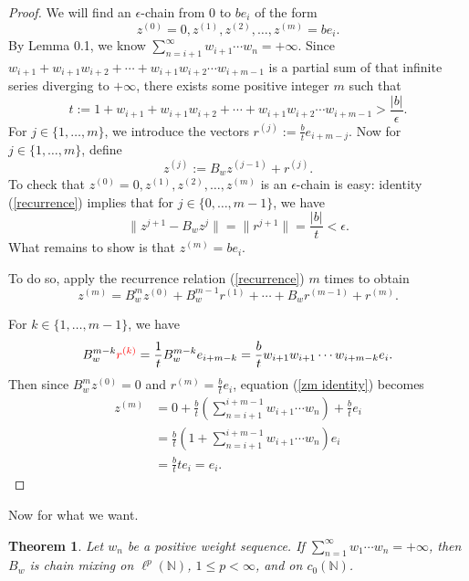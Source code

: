 \documentclass{article}
\newcommand{\ds}{\displaystyle}
\newtheorem{theorem}{Theorem}[section]
\theoremstyle{definition}\newtheorem{remark}[theorem]{Remark}
\theoremstyle{definition}\newtheorem{example}[theorem]{Example}
\theoremstyle{definition}\newtheorem{fact}[theorem]{Fact}
\theoremstyle{definition}\newtheorem{diagram}[theorem]{Diagram}
\theoremstyle{definition}\newtheorem{definition}[theorem]{Definition}
\theoremstyle{definition}\newtheorem{question}[theorem]{Question}
\newcommand{\N}{\mathbb{N}}
\begin{document}
\begin{proof}
    We will find an $\epsilon$-chain from $0$ to $be_i$ of the form
    \[z^{(0)}=0,z^{(1)},z^{(2)},\ldots,z^{(m)}=be_i.\]
    By Lemma 0.1, we know $\ds\sum_{n=i+1}^\infty w_{i+1}\cdots w_n =+\infty$. Since $w_{i+1}+w_{i+1}w_{i+2}+\cdots +w_{i+1}w_{i+2}\cdots w_{i+m-1}$ is a partial sum of that infinite series diverging to $+\infty$, there exists some positive integer $m$ such that
    \[t:=1+w_{i+1}+w_{i+1}w_{i+2}+\cdots +w_{i+1}w_{i+2}\cdots w_{i+m-1}>\frac{|b|}{\epsilon}.\]
    For $j\in \{1,\ldots,m\}$, we introduce the vectors $r^{(j)}:=\ds\frac{b}{t} e_{i+m-j}$. Now for $j\in \{1,\ldots,m\}$, define
    \begin{equation}\label{recurrence}
        z^{(j)}:=B_w z^{(j-1)}+r^{(j)}.
    \end{equation}
    To check that $z^{(0)}=0,z^{(1)},z^{(2)},\ldots,z^{(m)}$ is an $\epsilon$-chain is easy: identity (\ref{recurrence}) implies that for $j\in \{0,\ldots,m-1\}$, we have
    \[\|z^{j+1}-B_w z^{j}\|=\|r^{j+1}\|=\frac{|b|}{t}<\epsilon.\]
    What remains to show is that $z^{(m)}=be_i$. 

    To do so, apply the recurrence relation (\ref{recurrence}) $m$ times to obtain
    \begin{equation}\label{zm identity}
        z^{(m)}=B_w^m z^{(0)}+B_w^{m-1}r^{(1)}+\cdots +B_w r^{(m-1)}+r^{(m)}.
    \end{equation}
    
    For $k\in \{1,\ldots,m-1\}$, we have 
    \[B_w^{m-k} {\color{red} r^{(k)}}=\frac{1}{t}B_w^{m-k}e_{i+m-k}=\frac bt w_{i+1}w_{i+1}\cdots w_{i+m-k} e_i.\]
    Then since $B_w^m z^{(0)}=0$ and $r^{(m)}=\frac{b}{t}e_i$, equation (\ref{zm identity}) becomes
    \begin{align*}
        z^{(m)} & =0+\frac bt \left(\sum_{n=i+1}^{i+m-1} w_{i+1}\cdots w_n\right)+\frac bt e_i \\
        & = \frac bt  \left(1+\sum_{n=i+1}^{i+m-1} w_{i+1}\cdots w_n\right)e_i\\
        & = \frac bt te_i=e_i.
    \end{align*}
\end{proof}

Now for what we want.

\begin{theorem}
    Let $w_n$ be a positive weight sequence. If $\ds\sum_{n=1}^\infty w_1\cdots w_n =+\infty$, then $B_w$ is chain mixing on $\ell^p(\N)$, $1\leq p<\infty$, and on $c_0(\N)$.
\end{theorem}
\end{document}
